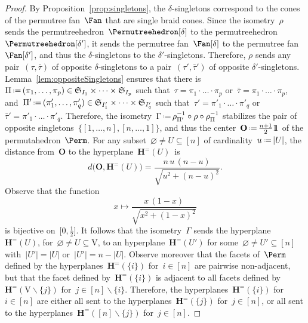 \documentclass[ALCO]{cedram}
\newcommand{\fS}{\mathfrak{S}} %
\renewcommand{\b}[1]{\mathbf{#1}} %
\newcommand{\ssm}{\smallsetminus} %
\newcommand{\one}{{1\!\!1}} %
\newcommand{\eqdef}{\mbox{\,\raisebox{0.2ex}{\scriptsize\ensuremath{\mathrm:}}\ensuremath{=}\,}} %
\newcommand{\ground}{\mathrm{V}} %
\newcommand{\decoration}{\delta} %
\newcommand{\Hyp}{\b{H}^=} %
\begin{document}
\begin{proof}
By Proposition~\ref{prop:singletons}, the $\decoration$-singletons correspond to the cones of the permutree fan~$\Fan$ that are single braid cones. Since the isometry~$\rho$ sends the permutreehedron~$\Permutreehedron[\decoration]$ to the permutreehedron~$\Permutreehedron[\decoration']$, it sends the permutree fan~$\Fan[\decoration]$ to the permutree fan~$\Fan[\decoration']$, and thus the $\decoration$-singletons to the $\decoration'$-singletons. Therefore, $\rho$ sends any pair~$(\tau, \bar\tau)$ of opposite $\decoration$-singletons to a pair~$(\tau', \bar\tau')$ of opposite $\decoration'$-singletons. Lemma~\ref{lem:oppositeSingletons} ensures that there is~$\Pi \eqdef (\pi_1, \dots, \pi_p) \in \fS_{I_1} \times \dots \times \fS_{I_p}$ such that~${\tau = \pi_1 \cdot \ldots \cdot \pi_p}$ or~$\bar\tau = \pi_1 \cdot \ldots \cdot \pi_p$, and~$\Pi' \eqdef (\pi'_1, \dots, \pi'_{q}) \in \fS_{I'_1} \times \dots \times \fS_{I'_{q}}$ such that~$\tau' = \pi'_1 \cdot \ldots \cdot \pi'_{q}$ or~$\bar\tau' = \pi'_1 \cdot \ldots \cdot \pi'_{q}$. Therefore, the isometry~$\Gamma \eqdef \rho_{\Pi'}^{-1} \circ \rho \circ \rho_{\Pi}^{-1}$ stabilizes the pair of opposite singletons~$\{[1, \dots, n], [n, \dots, 1]\}$, and thus the center~$\b{O} \eqdef \frac{n+1}{2} \one$ of the permutahedron~$\Perm$. For any subset~$\varnothing \ne U \subseteq [n]$ of cardinality~$u \eqdef |U|$, the distance from~$\b{O}$ to the hyperplane~$\Hyp(U)$~is
\[
d \big( \b{O}, \Hyp(U) \big) = \frac{n \, u\, (n - u)}{\sqrt{u^2 + (n - u)^2}}.
\]
Observe that the function
\[
x \longmapsto \frac{x \, (1-x)}{\sqrt{x^2 + (1-x)^2}}
\]
is bijective on~$\big[ 0, \frac{1}{2} \big]$. It follows that the isometry~$\Gamma$ sends the hyperplane~$\Hyp(U)$, for~${\varnothing \ne U \subseteq \ground}$, to an hyperplane~$\Hyp(U')$ for some~$\varnothing \ne U' \subseteq [n]$ with~$|U'| = |U|$ or~$|U'| = n - |U|$. Observe moreover that the facets of~$\Perm$ defined by the hyperplanes~$\Hyp(\{i\})$ for~$i \in [n]$ are pairwise non-adjacent, but that the facet defined by~$\Hyp(\{i\})$ is adjacent to all facets defined by~${\Hyp(\ground \ssm \{j\})}$ for~$j \in [n] \ssm \{i\}$. Therefore, the hyperplanes~$\Hyp(\{i\})$ for~$i \in [n]$ are either all sent to the hyperplanes~$\Hyp(\{j\})$ for~$j \in [n]$, or all sent to the hyperplanes~$\Hyp([n] \ssm \{j\})$ for~$j \in [n]$.


\end{proof}
\end{document}
